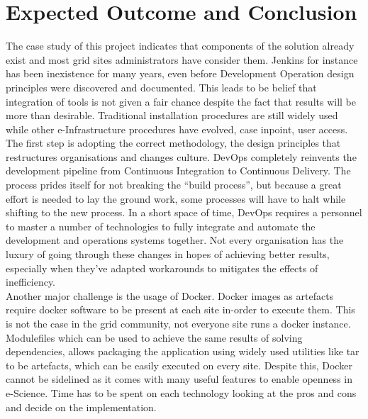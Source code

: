 \documentclass [titlepage,11pt]{article}
\begin{document}


\section{Expected Outcome and Conclusion}
The case study of this project indicates that components of the solution already exist and most grid sites administrators have consider them. Jenkins for instance has been inexistence for many years, even before Development Operation design principles were discovered and documented. This leads to be belief that integration of tools is not given a fair chance despite the fact that results will be more than desirable. Traditional installation procedures are still widely used while other e-Infrastructure procedures have evolved, case inpoint, user access. \\

The first step is adopting the correct methodology, the design principles that restructures organisations and changes culture. DevOps completely reinvents the development pipeline from Continuous Integration to Continuous Delivery. The process prides itself for not breaking the ``build process'', but because a great effort is needed to lay the ground work, some processes will have to halt while shifting to the new process. In a short space of time, DevOps requires a personnel to master a number of technologies to fully integrate and automate the development and operations systems together. Not every organisation has the luxury of going through these changes in hopes of achieving better results, especially when they've adapted workarounds to mitigates the effects of inefficiency.  \\

Another major challenge is the usage of Docker. Docker images as artefacts require docker software to be present at each site in-order to execute them. This is not the case in the grid community, not everyone site runs a docker instance. Modulefiles which can be used to achieve the same results of solving dependencies, allows packaging the application using widely used utilities like tar to be artefacts, which can be easily executed on every site. Despite this, Docker cannot be sidelined as it comes with many useful features to enable openness in e-Science. Time has to be spent on each technology looking at the pros and cons and decide on the implementation. \\
\end{document}
